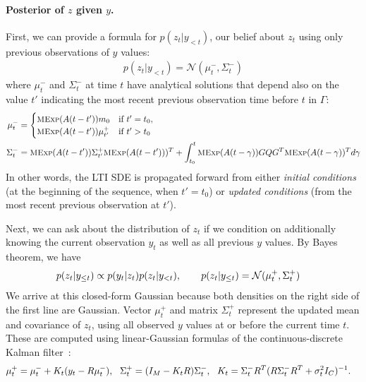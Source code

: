 \paragraph{Posterior of $z$ given $y$.}
First, we can provide a formula for $p(z_t|y_{<t})$, our belief about $z_t$ using only previous observations of $y$ values:
\begin{align}
        p(z_t|y_{< t} )=\mathcal{N}(\mu^{-}_{t}, \Sigma^{-}_{t})
\end{align}
where $\mu_t^-$ and $\Sigma_t^{-}$ at time $t$ have analytical solutions \citep{sarkka2019applied} that depend 
also on the value $t'$ indicating the most recent previous observation time before $t$ in $\Gamma$: 
\begin{align}
    \label{eq:CRU_predict}
\mu_t^- &=
\begin{cases}
    \MExp(A(t-t'))m_0 & \text{if } t'=t_0, \\
    \MExp(A(t-t'))\mu_{t'}^+ & \text{if }t'>t_0    
\end{cases}
\\ \notag
\Sigma_t^{-} %
    &= \MExp(A(t-t'))\Sigma_{t'}^+\MExp(A(t-t')))^T
    + \int_{t_0}^t\MExp(A(t-\gamma))GQG^T\MExp(A(t-\gamma))^T d\gamma 
\end{align}
In other words, the LTI SDE is propagated forward from either \emph{initial conditions} (at the beginning of the sequence, when $t'=t_0$) or \textit{updated conditions} (from the most recent previous observation at $t'$).


Next, we can ask about the distribution of $z_t$ if we condition on additionally knowing the current observation $y_t$ as well as all previous $y$ values. By Bayes theorem, we have
\begin{align*}
    p(z_t|y_{\leq t}) &\propto p(y_t|z_t)p(z_t|y_{<t}), \qquad 
   p(z_t|y_{\leq t}) =\mathcal{N}(\mu_t^+, \Sigma_t^+) \notag
\end{align*}
We arrive at this closed-form Gaussian because both densities on the right side of the first line are Gaussian. 
Vector $\mu_t^+$ and matrix $\Sigma_{t}^+$ represent the updated mean and covariance of $z_t$, using all observed $y$ values at or before the current time $t$. These are computed using linear-Gaussian formulas of the continuous-discrete Kalman filter~\citep{jazwinski2007stochastic}:
\begin{align}
    \label{eq:CRU_update}
    \mu_{t}^{+} &= \mu_{t}^{-}+K_t(y_t-R \mu_{t}^{-}),
    ~~\Sigma_{t}^{+} = (I_M -K_t R )\Sigma_{t}^{-},
    ~~K_t = \Sigma_{t}^{-} R^T(R \Sigma_{t}^{-} R^T + \sigma_t^2 I_C)^{-1}.
\end{align}

